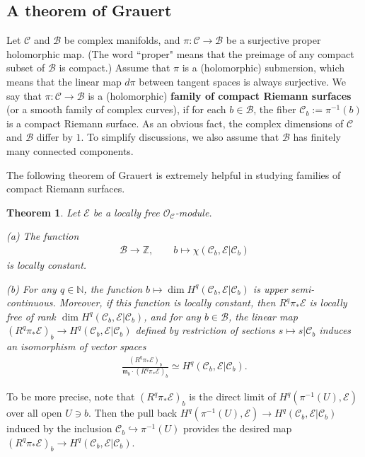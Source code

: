 \documentclass[12pt,b5paper,notitlepage]{report}
\theoremstyle{definition}
\theoremstyle{plain}
\newtheorem{thm}[df]{Theorem}
\newcommand{\fk}{\mathfrak}
\newcommand{\mc}{\mathcal}
\newcommand{\scr}{\mathscr}
\numberwithin{equation}{section}
\begin{document}
\subsection*{A theorem of Grauert}

Let $\mc C$ and $\mc B$ be complex manifolds, and $\pi:\mc C\rightarrow \mc B$ be a surjective proper holomorphic map. (The word ``proper" means that the preimage of any compact subset of $\mc B$ is compact.)  Assume that $\pi$ is a (holomorphic) submersion, which means that the linear map $d\pi$ between tangent spaces is always surjective. We say that $\pi:\mc C\rightarrow \mc B$ is a (holomorphic) \textbf{family of compact Riemann surfaces} (or a smooth family of complex curves), if for each $b\in\mc B$, the fiber $\mc C_b:=\pi^{-1}(b)$ \index{Cb@$\mc C_b=\pi^{-1}(b)$} is a compact Riemann surface. As an obvious fact, the complex dimensions of $\mc C$ and $\mc B$ differ by $1$. To simplify discussions, we also assume that $\mc B$ has finitely many connected components.



The following theorem of Grauert \cite{Gra60} is extremely helpful in studying families of compact Riemann surfaces.
\begin{thm}\label{lb2}
Let $\scr E$ be a locally free $\scr O_{\mc C}$-module.

(a) The function
\begin{gather*}
\mc B\rightarrow \mathbb Z, \qquad b\mapsto\chi(\mc C_b,\scr E|\mc C_b)
\end{gather*}
is locally constant. 

(b) For any $q\in\mathbb N$, the function  $b\mapsto\dim H^q(\mc C_b,\scr E|\mc C_b)$ is upper semi-continuous. Moreover, if this function is locally constant, then $R^q\pi_*\scr E$ is locally free of rank $\dim H^q(\mc C_b,\scr E|\mc C_b)$, and for any $b\in\mc B$, the linear map $(R^q\pi_*\scr E)_b\rightarrow H^q(\mc C_b,\scr E|\mc C_b)$ defined by  restriction of sections $s\mapsto s|{\mc C_b}$ induces an isomorphism of vector spaces
\begin{align}
\frac{(R^q\pi_*\scr E)_b}{\fk m_b\cdot (R^q\pi_*\scr E)_b}\simeq H^q(\mc C_b,\scr E|\mc C_b).
\end{align}
\end{thm}
To be more precise, note that $(R^q\pi_*\scr E)_b$ is the direct limit of $H^q(\pi^{-1}(U),\scr E)$ over all open $U\ni b$. Then the  pull back $H^q(\pi^{-1}(U),\scr E)\rightarrow H^q(\mc C_b,\scr E|\mc C_b)$   induced by the inclusion $\mc C_b\hookrightarrow \pi^{-1}(U)$ provides the desired map $(R^q\pi_*\scr E)_b\rightarrow H^q(\mc C_b,\scr E|\mc C_b)$.
\end{document}

